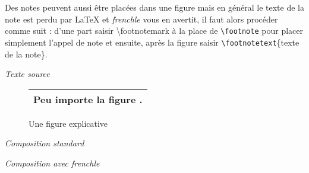 \documentclass[a4paper,12pt,openright]{article}
\begin{document}
Des notes peuvent aussi être placées dans une figure mais en général le texte
de la note est perdu par \LaTeX{} et \textit{frenchle} vous en avertit, il faut alors procéder
comme suit : d'une part 
saisir {\backslash}footnotemark à la place de \verb'\footnote' pour placer simplement 
l’appel de note et ensuite, après la figure saisir
 \verb'\footnotetext'\{texte de la note\}.\label{notesfigu}
\begin{center} %
\begin{minipage}{\textwidth}
\begin{center}
\textit{Texte source}\\[1ex]
\begin{boxedverbatim}
\begin{figure}
  \begin{tabular}{|c|} 
    \hline 
    \centerline{Peu importe la figure  \footnotemark.} \\ 
    \hline 
  \end{tabular} 
     \caption{Une figure explicative}
 \end{figure} 
\end{boxedverbatim}
\end{center}
\end{minipage}
\setcounter{mpfootnote}{1} %
\renewcommand{\thempfootnote}{\arabic{mpfootnote}}
\parbox{70mm}{
\begin{center}
\textit{Composition standard}
%
\end{center}
}%
\parbox{70mm}{
\begin{center}
\textit{Composition avec frenchle}


\end{center}}
\end{center}
\end{document}
